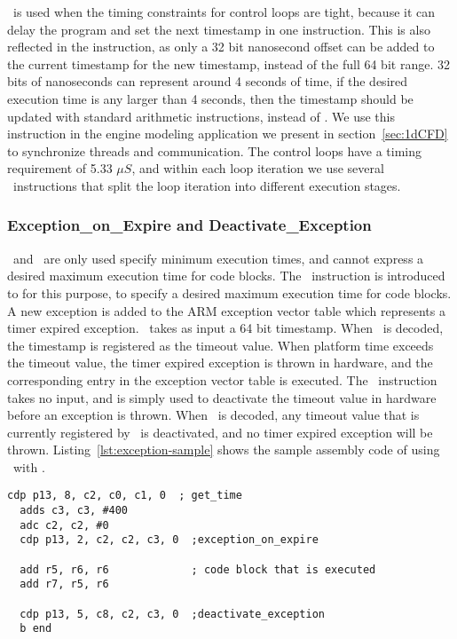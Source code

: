 \Delayandset\ is used when the timing constraints for control loops are tight, because it can delay the program and set the next timestamp in one instruction. 
This is also reflected in the instruction, as only a 32 bit nanosecond offset can be added to the current timestamp for the new timestamp, instead of the full 64 bit range. 
32 bits of nanoseconds can represent around 4 seconds of time, if the desired execution time is any larger than 4 seconds, then the timestamp should be updated with standard arithmetic instructions, instead of \delayandset.
We use this instruction in the engine modeling application we present in section~\ref{sec:1dCFD} to synchronize threads and communication. 
The control loops have a timing requirement of 5.33 $\mu S$, and within each loop iteration we use several \delayandset\ instructions that split the loop iteration into different execution stages. 

\subsubsection{Exception\_on\_Expire and Deactivate\_Exception}
\Delayuntil\ and \delayandset\ are only used specify minimum execution times, and cannot express a desired maximum execution time for code blocks.
The \exceptiononexpire\ instruction is introduced to for this purpose, to specify a desired maximum execution time for code blocks.
A new exception is added to the ARM exception vector table which represents a timer expired exception. 
\Exceptiononexpire\ takes as input a 64 bit timestamp.
When \exceptiononexpire\ is decoded, the timestamp is registered as the timeout value. 
When platform time exceeds the timeout value, the timer expired exception is thrown in hardware, and the corresponding entry in the exception vector table is executed.
The \deactivateexception\ instruction takes no input, and is simply used to deactivate the timeout value in hardware before an exception is thrown.
When \deactivateexception\ is decoded, any timeout value that is currently registered by \exceptiononexpire\ is deactivated, and no timer expired exception will be thrown. 
Listing~\ref{lst:exception-sample} shows the sample assembly code of using \exceptiononexpire\ with \deactivateexception.  
\begin{lstlisting}[label=lst:exception-sample,caption=Sample assembly code of exception\_on\_expire and deactivate\_exception ]
  cdp p13, 8, c2, c0, c1, 0  ; get_time
  adds c3, c3, #400
  adc c2, c2, #0
  cdp p13, 2, c2, c2, c3, 0  ;exception_on_expire

  add r5, r6, r6             ; code block that is executed
  add r7, r5, r6
  
  cdp p13, 5, c8, c2, c3, 0  ;deactivate_exception
  b end
\end{lstlisting}

